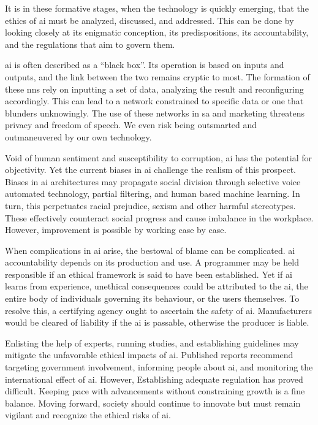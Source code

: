 \documentclass{report}
\begin{document}
It is in these formative stages, when the technology is quickly emerging, that the ethics of \ac{ai} must be analyzed, discussed, and addressed. 
This can be done by looking closely at its enigmatic conception, its predispositions, its accountability, and the regulations that aim to govern them. 

\ac{ai} is often described as a ``black box''. 
Its operation is based on inputs and outputs, and the link between the two remains cryptic to most. 
The formation of these \acp{nn} rely on inputting a set of data, analyzing the result and reconfiguring accordingly. 
This can lead to a network constrained to specific data or one that blunders unknowingly. 
The use of these networks in \ac{sa} and marketing threatens privacy and freedom of speech. 
We even risk being outsmarted and outmaneuvered by our own technology.  

Void of human sentiment and susceptibility to corruption, \ac{ai} has the potential for objectivity. 
Yet the current biases in \ac{ai} challenge the realism of this prospect. 
Biases in \ac{ai} architectures may propagate social division through selective voice automated technology, partial filtering, and human based machine learning. 
In turn, this perpetuates racial prejudice, sexism and other harmful stereotypes. 
These effectively counteract social progress and cause imbalance in the workplace. 
However, improvement is possible by working case by case.

When complications in \ac{ai} arise, the bestowal of blame can be complicated. 
\ac{ai} accountability  depends on its production and use. 
A programmer may be held responsible if an  ethical framework is said to have been established. 
Yet if \ac{ai} learns from experience, unethical consequences could be attributed to the \ac{ai}, the entire body of individuals governing its behaviour, or the users themselves. 
To resolve this, a certifying agency ought to ascertain the safety of \ac{ai}. 
Manufacturers would be cleared of liability if the \ac{ai} is passable, otherwise the producer is liable.

Enlisting the help of experts, running studies, and establishing guidelines may mitigate the  unfavorable ethical impacts of \ac{ai}. 
Published reports recommend targeting government involvement, informing people about \ac{ai}, and monitoring the international effect of \ac{ai}. 
However, Establishing adequate regulation has proved difficult. Keeping pace with advancements without constraining growth is a fine balance. 
Moving forward, society should continue to innovate but must remain vigilant and recognize the ethical risks of \ac{ai}. 

\newpage



\end{document}

